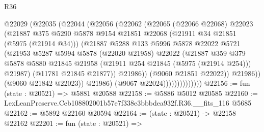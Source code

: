 \begin{lexlean}{R36}
\begin{coremodule}
                            @22029
                              (@22035
                                (@22044
                                  (@22056
                                    (@22062
                                      (@22065
                                        (@22066 @22068)
                                        @22023
                                        (@21887
                                          @375
                                          @5290
                                          @5878
                                          @9154
                                          @21851
                                          @22068
                                          (@21911 @34 @21851 (@5975 (@21914 @34)))
                                          (@21887
                                            @5288
                                            @133
                                            @5996
                                            @5878
                                            @22022
                                            @5721
                                            (@21953
                                              @5287
                                              @5994
                                              @5878
                                              (@22020 @21958)
                                              @22022
                                              (@21887
                                                @359
                                                @379
                                                @5878
                                                @5880
                                                @21845
                                                @21958
                                                (@21911 @254 @21845 (@5975 (@21914 @254)))
                                                @21987)
                                              (@11781 @21845 @21877))
                                            @21986))
                                        (@9060 @21851 @22022))
                                      @21986))
                                  (@9060 @21842 @22023))
                                @21986)
                              (@9067 @22024))))))))))))))
@22156 := fun (state : @20521) => @5881 @20588
@22158 := @5886 @5012 @20585
@22160 := LexLeanPreserve.Ceb108802001b57e7f338e3bbbdea932f.R36.__fits_116 @5685
@22162 := @5892 @22160 @20594
@22164 := (state : @20521) -> @22158 @22162
@22201 := fun (state : @20521) =>

\end{coremodule}
\end{lexlean}

